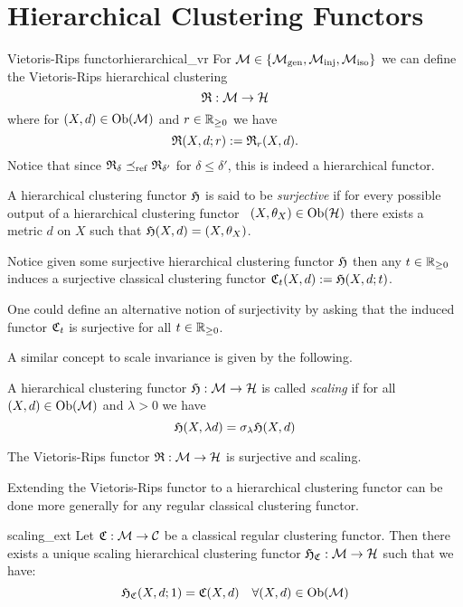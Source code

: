 \chapter{Hierarchical Clustering Functors}

\begin{defprop}{Vietoris-Rips functor}{hierarchical_vr}
For $\mathcal{M} \in \{{\mathcal{M}_\mathrm{gen}},{\mathcal{M}_\mathrm{inj}},{\mathcal{M}_\mathrm{iso}}\}$ we can define the Vietoris-Rips hierarchical clustering
$$
\mathfrak{R}: \mathcal{M} \to \mathcal{H}
$$
where for $(X,d) \in \mathrm {Ob}(\mathcal{M})$ and $r \in \mathbb R_{\geq0}$ we have
$$
\mathfrak{R}(X,d; r) := \mathfrak{R}_r(X,d).
$$
Notice that since $\mathfrak{R}_\delta \preceq_\mathrm{ref} \mathfrak{R}_{\delta'}$ for $\delta \leq \delta'$, this is indeed a hierarchical functor.
\end{defprop}


\begin{definition}{}{}
    A hierarchical clustering functor $\mathfrak{H}$ is said to be \emph{surjective} if for every possible output of a hierarchical clustering functor \ie\ $(X, \theta_X) \in \mathrm {Ob}(\mathcal{H})$ there exists a metric $d$ on $X$ such that $\mathfrak{H}(X,d) = (X, \theta_X)$.
\end{definition}

Notice given some surjective hierarchical clustering functor $\mathfrak{H}$ then any $t \in \mathbb R_{\geq0}$ induces a surjective classical clustering functor $\mathfrak{C}_t(X,d) := \mathfrak{H}(X, d; t)$.


One could define an alternative notion of surjectivity by asking that the induced functor $\mathfrak{C}_t$ is surjective for all $t \in \mathbb R_{\geq0}$.

A similar concept to scale invariance is given by the following.

\begin{definition}{}{}
A hierarchical clustering functor $\mathfrak{H}: \mathcal{M} \to \mathcal{H}$ is called \emph{scaling} if for all $(X,d) \in \mathrm {Ob}(\mathcal{M})$ and $\lambda > 0$ we have
$$
\mathfrak{H}(X, \lambda d) = \sigma_\lambda \mathfrak{H}(X,d)
$$
\end{definition}

\begin{proposition}{}{}
The Vietoris-Rips functor $\mathfrak{R}: \mathcal{M} \to \mathcal{H}$ is surjective and scaling.
\end{proposition}



Extending the Vietoris-Rips functor to a hierarchical clustering functor can be done more generally for any regular classical clustering functor.
\begin{definition}{}{scaling_ext}
Let $\mathfrak{C}: \mathcal{M} \to \mathcal{C}$ be a classical regular clustering functor. Then there exists a unique scaling hierarchical clustering functor $\mathfrak{H}_{\mathfrak{C}}: \mathcal{M} \to \mathcal{H}$ such that we have:
$$
\mathfrak{H}_{\mathfrak{C}}(X,d; 1) = \mathfrak{C}(X,d) \quad \forall (X,d) \in \mathrm {Ob}(\mathcal{M})
$$
\end{definition}

